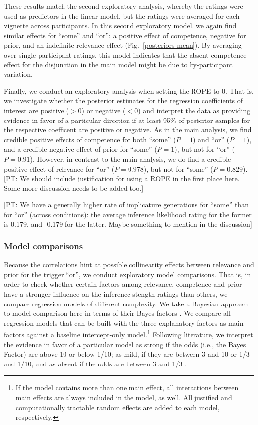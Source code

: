 \documentclass{sp}
\newcommand{\pt}[1]{\textcolor{Cerulean}{[PT: #1]}}
\begin{document}
These results match the second exploratory analysis, whereby the ratings were used as predictors in the linear model, but the ratings were averaged for each vignette across participants. In this second  exploratory model, we again find similar effects for ``some'' and ``or'': a positive effect of competence, negative for prior, and an indefinite relevance effect (Fig.~\ref{posteriors-mean}). By averaging over single participant ratings, this model indicates that the absent competence effect for the disjunction in the main model might be due to by-participant variation.


Finally, we conduct an exploratory analysis when setting the ROPE to 0. That is, we investigate whether the posterior estimates for the regression coefficients of interest are positive ($>0$) or negative ($<0$) and interpret the data as providing evidence in favor of a particular direction if at least 95\% of posterior samples for the respective coefficent are positive or negative. As in the main analysis, we find credible positive effects of competence for both ``some'' ($P = 1$) and ``or'' ($P = 1$), and a credible negative effect of prior for ``some'' ($P = 1$), but not for ``or'' ($P=0.91$). However, in contrast to the main analysis, we do find a credible positive effect of relevance for ``or'' ($P=0.978$), but not for ``some'' ($P=0.829$). \pt{We should include justification for using a ROPE in the first place here. Some more discussion needs to be added too.} 

\pt{We have a generally higher rate of implicature generations for ``some'' than for ``or'' (across conditions): the average inference likelihood rating for the former is 0.179, and -0.179 for the latter. Maybe something to mention in the discussion}

\subsubsection{Model comparisons}
Because the correlations hint at possible collinearity effects between relevance and prior for the trigger ``or'', we conduct exploratory model comparisons. That is, in order to check whether certain factors among relevance, competence and prior have a stronger influence on the inference stength ratings than others, we compare regression models of different complexity. We take a Bayesian approach to model comparison here in terms of their Bayes factors \citep{rouder2012default}.
We compare all regression models that can be built with the three explanatory factors as main factors against a baseline intercept-only model.\footnote{If the model contains more than one main effect, all interactions between main effects are always included in the model, as well. All justified and computationally tractable random effects are added to each model, respectively.}
Following literature, we interpret the evidence in favor of a particular model as strong if the odds (i.e., the Bayes Factor) are above 10 or below 1/10; as mild, if they are between 3 and 10 or 1/3 and 1/10; and as absent if the odds are between 3 and 1/3 \citep[e.g.,][]{lodewyckx2011tutorial}. 
\end{document}
